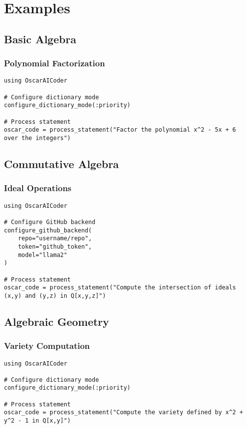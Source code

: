 \documentclass[11pt,a4paper]{article}
\begin{document}
\section{Examples}

\subsection{Basic Algebra}

\subsubsection{Polynomial Factorization}

\begin{lstlisting}
using OscarAICoder

# Configure dictionary mode
configure_dictionary_mode(:priority)

# Process statement
oscar_code = process_statement("Factor the polynomial x^2 - 5x + 6 over the integers")
\end{lstlisting}

\subsection{Commutative Algebra}

\subsubsection{Ideal Operations}

\begin{lstlisting}
using OscarAICoder

# Configure GitHub backend
configure_github_backend(
    repo="username/repo",
    token="github_token",
    model="llama2"
)

# Process statement
oscar_code = process_statement("Compute the intersection of ideals (x,y) and (y,z) in Q[x,y,z]")
\end{lstlisting}

\subsection{Algebraic Geometry}

\subsubsection{Variety Computation}

\begin{lstlisting}
using OscarAICoder

# Configure dictionary mode
configure_dictionary_mode(:priority)

# Process statement
oscar_code = process_statement("Compute the variety defined by x^2 + y^2 - 1 in Q[x,y]")
\end{lstlisting}
\end{document}
